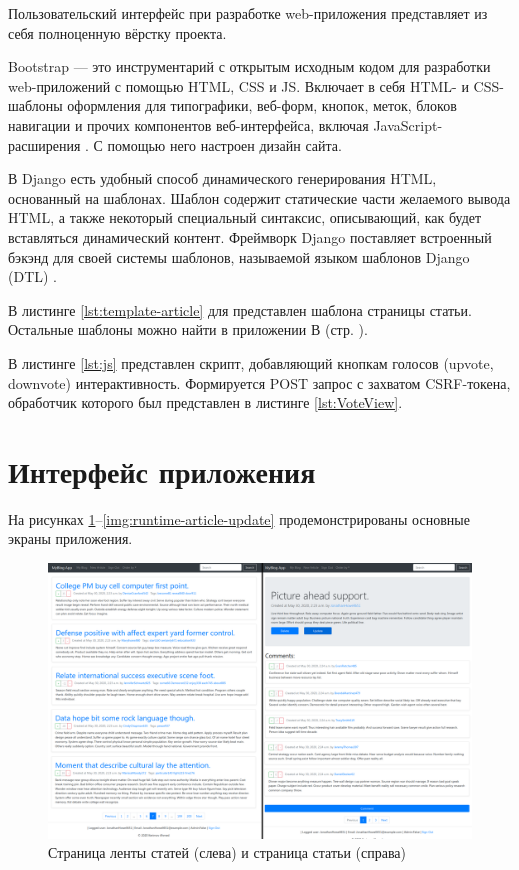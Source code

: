 Пользовательский интерфейс при разработке web-приложения представляет из себя полноценную вёрстку проекта.

Bootstrap — это инструментарий с открытым исходным кодом для разработки web-приложений с помощью HTML, CSS и JS.
Включает в себя HTML- и CSS-шаблоны оформления для типографики, веб-форм, кнопок, меток, блоков навигации и прочих компонентов веб-интерфейса, включая JavaScript-расширения \cite{bootstrap}.
С помощью него настроен дизайн сайта.

В Django есть удобный способ динамического генерирования HTML, основанный на шаблонах.
Шаблон содержит статические части желаемого вывода HTML, а также некоторый специальный синтаксис, описывающий, как будет вставляться динамический контент.
Фреймворк Django поставляет встроенный бэкэнд для своей системы шаблонов, называемой языком шаблонов Django (DTL) \cite{django}.

В листинге \ref{lst:template-article} для представлен шаблона страницы статьи.
Остальные шаблоны можно найти в приложении В (стр. \pageref{chp:attachment-c}).



В листинге \ref{lst:js} представлен скрипт, добавляющий кнопкам голосов (upvote, downvote) интерактивность.
Формируется POST запрос с захватом CSRF-токена, обработчик которого был представлен в листинге \ref{lst:VoteView}.



\section{Интерфейс приложения}

На рисунках \ref{img:runtime-feed-and-article}--\ref{img:runtime-article-update} продемонстрированы основные экраны приложения.

\begin{figure}[H]
	\centering
	\includegraphics[width=\linewidth]{inc/img/runtime-feed-and-article}
	\caption{Страница ленты статей (слева) и страница статьи (справа)}
	\label{img:runtime-feed-and-article}
\end{figure}

